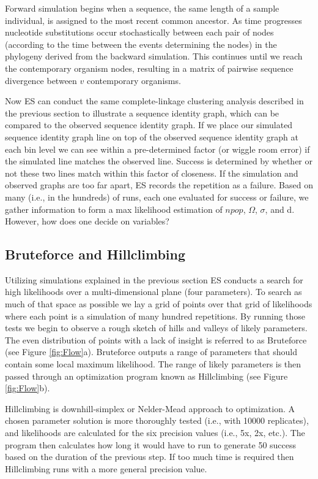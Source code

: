 Forward simulation begins when a sequence, the same length of a sample individual, is assigned to the most recent common ancestor.
As time progresses nucleotide substitutions occur stochastically between each pair of nodes (according to the time between the events determining the nodes) in the phylogeny derived from the backward simulation. 
This continues until we reach the contemporary organism nodes, resulting in a matrix of pairwise sequence divergence between $v$ contemporary organisms.

Now ES can conduct the same complete-linkage clustering analysis described in the previous section to illustrate a sequence identity graph, which can be compared to the observed sequence identity graph.
If we place our simulated sequence identity graph line on top of the observed sequence identity graph at each bin level we can see within a pre-determined factor (or wiggle room error) if the simulated line matches the observed line.
Success is determined by whether or not these two lines match within this factor of closeness.
If the simulation and observed graphs are too far apart, ES records the repetition as a failure.
Based on many (i.e., in the hundreds) of runs, each one evaluated for success or failure, we gather information to form a max likelihood estimation of $npop$, $\Omega$, $\sigma$, and d. However, how does one decide on variables?

\subsection*{Bruteforce and Hillclimbing}
Utilizing simulations explained in the previous section ES conducts a search for high likelihoods over a multi-dimensional plane (four parameters).
To search as much of that space as possible we lay a grid of points over that grid of likelihoods where each point is a simulation of many hundred repetitions.
By running those tests we begin to observe a rough sketch of hills and valleys of likely parameters.
The even distribution of points with a lack of insight is referred to as Bruteforce (see Figure \ref{fig:Flow}a).
Bruteforce outputs a range of parameters that should contain some local maximum likelihood.
The range of likely parameters is then passed through an optimization program known as Hillclimbing (see Figure \ref{fig:Flow}b).

Hillclimbing is  downhill-simplex or Nelder-Mead approach to optimization.
A chosen parameter solution is more thoroughly tested (i.e., with 10000 replicates), and likelihoods are calculated for the six precision values (i.e., 5x, 2x, etc.).
The program then calculates how long it would have to run to generate 50 success based on the duration of the previous step.
If too much time is required then Hillclimbing runs with a more general precision value.


